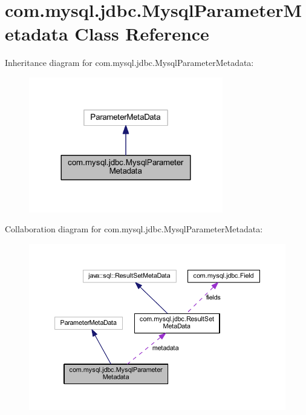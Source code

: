 \hypertarget{classcom_1_1mysql_1_1jdbc_1_1_mysql_parameter_metadata}{}\section{com.\+mysql.\+jdbc.\+Mysql\+Parameter\+Metadata Class Reference}
\label{classcom_1_1mysql_1_1jdbc_1_1_mysql_parameter_metadata}


Inheritance diagram for com.\+mysql.\+jdbc.\+Mysql\+Parameter\+Metadata\+:
\nopagebreak
\begin{figure}[H]
\begin{center}
\leavevmode
\includegraphics[width=240pt]{classcom_1_1mysql_1_1jdbc_1_1_mysql_parameter_metadata__inherit__graph}
\end{center}
\end{figure}


Collaboration diagram for com.\+mysql.\+jdbc.\+Mysql\+Parameter\+Metadata\+:
\nopagebreak
\begin{figure}[H]
\begin{center}
\leavevmode
\includegraphics[width=350pt]{classcom_1_1mysql_1_1jdbc_1_1_mysql_parameter_metadata__coll__graph}
\end{center}
\end{figure}
